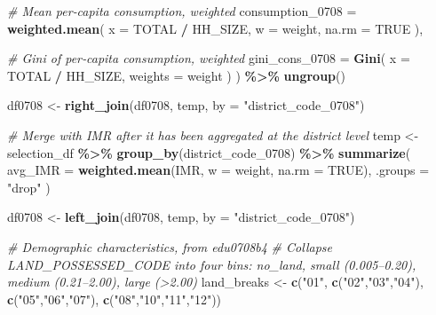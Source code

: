 \documentclass[
]{article}
\newenvironment{Shaded}{\begin{snugshade}}{\end{snugshade}}
\newcommand{\AttributeTok}[1]{\textcolor[rgb]{0.13,0.29,0.53}{#1}}
\newcommand{\CommentTok}[1]{\textcolor[rgb]{0.56,0.35,0.01}{\textit{#1}}}
\newcommand{\ConstantTok}[1]{\textcolor[rgb]{0.56,0.35,0.01}{#1}}
\newcommand{\FunctionTok}[1]{\textcolor[rgb]{0.13,0.29,0.53}{\textbf{#1}}}
\newcommand{\NormalTok}[1]{#1}
\newcommand{\OtherTok}[1]{\textcolor[rgb]{0.56,0.35,0.01}{#1}}
\newcommand{\SpecialCharTok}[1]{\textcolor[rgb]{0.81,0.36,0.00}{\textbf{#1}}}
\newcommand{\StringTok}[1]{\textcolor[rgb]{0.31,0.60,0.02}{#1}}
\begin{document}
\begin{Shaded}
\begin{Highlighting}[]
    \CommentTok{\# Mean per‑capita consumption, weighted}
    \AttributeTok{consumption\_0708 =} \FunctionTok{weighted.mean}\NormalTok{(}
      \AttributeTok{x =}\NormalTok{ TOTAL }\SpecialCharTok{/}\NormalTok{ HH\_SIZE,}
      \AttributeTok{w =}\NormalTok{ weight,}
      \AttributeTok{na.rm =} \ConstantTok{TRUE}
\NormalTok{    ),}

    \CommentTok{\# Gini of per‑capita consumption, weighted}
    \AttributeTok{gini\_cons\_0708 =} \FunctionTok{Gini}\NormalTok{(}
      \AttributeTok{x       =}\NormalTok{ TOTAL }\SpecialCharTok{/}\NormalTok{ HH\_SIZE,}
      \AttributeTok{weights =}\NormalTok{ weight}
\NormalTok{    )}
\NormalTok{  ) }\SpecialCharTok{\%\textgreater{}\%}
  \FunctionTok{ungroup}\NormalTok{()}

\NormalTok{df0708 }\OtherTok{\textless{}{-}} \FunctionTok{right\_join}\NormalTok{(df0708, temp, }\AttributeTok{by =} \StringTok{"district\_code\_0708"}\NormalTok{)}




\CommentTok{\# Merge with IMR after it has been aggregated at the district level}
\NormalTok{temp }\OtherTok{\textless{}{-}}\NormalTok{ selection\_df }\SpecialCharTok{\%\textgreater{}\%} 
  \FunctionTok{group\_by}\NormalTok{(district\_code\_0708) }\SpecialCharTok{\%\textgreater{}\%} 
  \FunctionTok{summarize}\NormalTok{(}
    \AttributeTok{avg\_IMR =} \FunctionTok{weighted.mean}\NormalTok{(IMR, }\AttributeTok{w =}\NormalTok{ weight, }\AttributeTok{na.rm =} \ConstantTok{TRUE}\NormalTok{),}
    \AttributeTok{.groups =} \StringTok{"drop"}
\NormalTok{    )}

\NormalTok{df0708 }\OtherTok{\textless{}{-}} \FunctionTok{left\_join}\NormalTok{(df0708, temp, }\AttributeTok{by =} \StringTok{"district\_code\_0708"}\NormalTok{)}




\CommentTok{\# Demographic characteristics, from edu0708b4}
\CommentTok{\# Collapse LAND\_POSSESSED\_CODE into four bins: no\_land, small (0.005–0.20), medium (0.21–2.00), large (\textgreater{}2.00)}
\NormalTok{land\_breaks }\OtherTok{\textless{}{-}} \FunctionTok{c}\NormalTok{(}\StringTok{"01"}\NormalTok{, }\FunctionTok{c}\NormalTok{(}\StringTok{"02"}\NormalTok{,}\StringTok{"03"}\NormalTok{,}\StringTok{"04"}\NormalTok{), }\FunctionTok{c}\NormalTok{(}\StringTok{"05"}\NormalTok{,}\StringTok{"06"}\NormalTok{,}\StringTok{"07"}\NormalTok{), }\FunctionTok{c}\NormalTok{(}\StringTok{"08"}\NormalTok{,}\StringTok{"10"}\NormalTok{,}\StringTok{"11"}\NormalTok{,}\StringTok{"12"}\NormalTok{))}


\end{Highlighting}
\end{Shaded}
\end{document}
